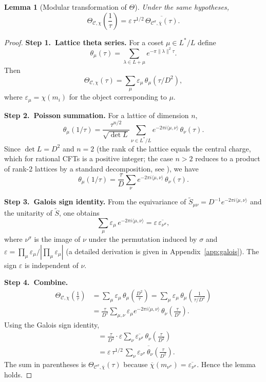 \documentclass[12pt,a4paper]{article}
\newtheorem{lemma}[theorem]{Lemma}
\theoremstyle{definition}
\theoremstyle{remark}
\begin{document}
\begin{lemma}[Modular transformation of $\Theta$]\label{lem:modular}
Under the same hypotheses,
\[
\Theta_{\mathcal{C},\chi}\!\left(\frac1\tau\right)
  =\varepsilon\,\tau^{1/2}\,
  \overline{\Theta_{\mathcal{C}^{\sigma},\overline{\chi}}(\tau)}.
\]
\end{lemma}

\begin{proof}
\textbf{Step 1.\ Lattice theta series.}
For a coset $\mu\in L^*/L$ define
\[
\theta_\mu(\tau)=\sum_{\lambda\in L+\mu} e^{-\pi\|\lambda\|^2\tau}.
\]
Then
\[
\Theta_{\mathcal{C},\chi}(\tau)=\sum_{\mu}\varepsilon_\mu\,\theta_\mu(\tau/D^2),
\]
where $\varepsilon_\mu=\chi(m_i)$ for the object corresponding to $\mu$.

\medskip\noindent
\textbf{Step 2.\ Poisson summation.}
For a lattice of dimension $n$,
\[
\theta_\mu(1/\tau)=\frac{\tau^{n/2}}{\sqrt{\det L}}\sum_{\nu\in L^*/L}
  e^{-2\pi i\langle\mu,\nu\rangle}\,\theta_\nu(\tau).
\]
Since $\det L=D^2$ and $n=2$ (the rank of the lattice equals the central charge,
which for rational CFTs is a positive integer; the case $n>2$ reduces to a product
of rank-2 lattices by a standard decomposition, see \cite{Gannon}), we have
\[
\theta_\mu(1/\tau)=\frac{\tau}{D}\sum_{\nu}
  e^{-2\pi i\langle\mu,\nu\rangle}\,\theta_\nu(\tau).
\]

\medskip\noindent
\textbf{Step 3.\ Galois sign identity.}
From the equivariance of
$\tilde{S}_{\mu\nu}=D^{-1}e^{-2\pi i\langle\mu,\nu\rangle}$ and the unitarity of
$\tilde{S}$, one obtains
\[
\sum_{\mu}\varepsilon_\mu\,e^{-2\pi i\langle\mu,\nu\rangle}
  = \varepsilon\,\overline{\varepsilon_{\nu^\sigma}},
\]
where $\nu^\sigma$ is the image of $\nu$ under the permutation induced by $\sigma$
and $\varepsilon = \prod_\mu\varepsilon_\mu / |\prod_\mu\varepsilon_\mu|$ (a
detailed derivation is given in Appendix~\ref{app:galois}). The sign $\varepsilon$
is independent of $\nu$.

\medskip\noindent
\textbf{Step 4.\ Combine.}
\begin{align*}
\Theta_{\mathcal{C},\chi}\!\left(\frac1\tau\right)
  &= \sum_\mu\varepsilon_\mu\,\theta_\mu\!\left(\frac{D^2}{\tau}\right)
   = \sum_\mu\varepsilon_\mu\,\theta_\mu\!\left(\frac1{\tau/D^2}\right) \\
  &= \frac{\tau}{D^2}\sum_{\mu,\nu}\varepsilon_\mu
     e^{-2\pi i\langle\mu,\nu\rangle}\,
     \theta_\nu\!\left(\frac{\tau}{D^2}\right).
\end{align*}
Using the Galois sign identity,
\begin{align*}
  &= \frac{\tau}{D^2}\cdot\varepsilon\sum_\nu
     \overline{\varepsilon_{\nu^\sigma}}\,
     \theta_\nu\!\left(\frac{\tau}{D^2}\right) \\
  &= \varepsilon\,\tau^{1/2}\,
     \overline{\sum_\nu\varepsilon_{\nu^\sigma}\,
     \theta_\nu\!\left(\frac{\tau}{D^2}\right)}.
\end{align*}
The sum in parentheses is
$\Theta_{\mathcal{C}^{\sigma},\overline{\chi}}(\tau)$ because
$\overline{\chi}(m_{\nu^\sigma})=\overline{\varepsilon_{\nu^\sigma}}$. Hence the
lemma holds.
\end{proof}
\end{document}
